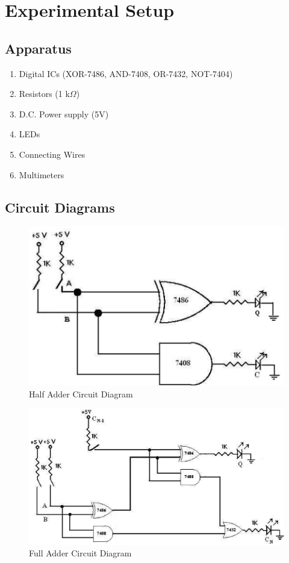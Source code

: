 \section{Experimental Setup}
\subsection*{Apparatus}

\begin{enumerate}
    \item Digital ICs (XOR-7486, AND-7408, OR-7432, NOT-7404) 
    \item Resistors (1 k$\Omega$)
    \item D.C. Power supply (5V)
    \item LEDs
    \item Connecting Wires
    \item Multimeters
\end{enumerate}

\subsection*{Circuit Diagrams}
\begin{figure}[H]
    \centering
    \includegraphics[width=0.65\columnwidth]{images/c-half-add.png}
    \caption{Half Adder Circuit Diagram}
    \label{half-add}
\end{figure}

\begin{figure}[H]
    \centering
    \includegraphics[width=0.8\columnwidth]{images/c-full-add.png}
    \caption{Full Adder Circuit Diagram}
    \label{full-add}
\end{figure}

